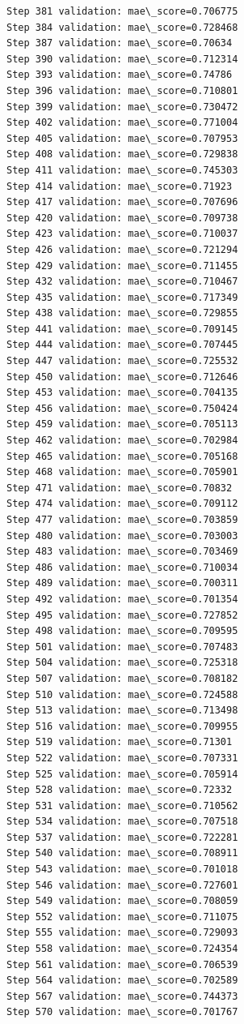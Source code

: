 \documentclass[11pt]{article}
\begin{document}
\begin{Verbatim}[commandchars=\\\{\}]
Step 381 validation: mae\_score=0.706775
Step 384 validation: mae\_score=0.728468
Step 387 validation: mae\_score=0.70634
Step 390 validation: mae\_score=0.712314
Step 393 validation: mae\_score=0.74786
Step 396 validation: mae\_score=0.710801
Step 399 validation: mae\_score=0.730472
Step 402 validation: mae\_score=0.771004
Step 405 validation: mae\_score=0.707953
Step 408 validation: mae\_score=0.729838
Step 411 validation: mae\_score=0.745303
Step 414 validation: mae\_score=0.71923
Step 417 validation: mae\_score=0.707696
Step 420 validation: mae\_score=0.709738
Step 423 validation: mae\_score=0.710037
Step 426 validation: mae\_score=0.721294
Step 429 validation: mae\_score=0.711455
Step 432 validation: mae\_score=0.710467
Step 435 validation: mae\_score=0.717349
Step 438 validation: mae\_score=0.729855
Step 441 validation: mae\_score=0.709145
Step 444 validation: mae\_score=0.707445
Step 447 validation: mae\_score=0.725532
Step 450 validation: mae\_score=0.712646
Step 453 validation: mae\_score=0.704135
Step 456 validation: mae\_score=0.750424
Step 459 validation: mae\_score=0.705113
Step 462 validation: mae\_score=0.702984
Step 465 validation: mae\_score=0.705168
Step 468 validation: mae\_score=0.705901
Step 471 validation: mae\_score=0.70832
Step 474 validation: mae\_score=0.709112
Step 477 validation: mae\_score=0.703859
Step 480 validation: mae\_score=0.703003
Step 483 validation: mae\_score=0.703469
Step 486 validation: mae\_score=0.710034
Step 489 validation: mae\_score=0.700311
Step 492 validation: mae\_score=0.701354
Step 495 validation: mae\_score=0.727852
Step 498 validation: mae\_score=0.709595
Step 501 validation: mae\_score=0.707483
Step 504 validation: mae\_score=0.725318
Step 507 validation: mae\_score=0.708182
Step 510 validation: mae\_score=0.724588
Step 513 validation: mae\_score=0.713498
Step 516 validation: mae\_score=0.709955
Step 519 validation: mae\_score=0.71301
Step 522 validation: mae\_score=0.707331
Step 525 validation: mae\_score=0.705914
Step 528 validation: mae\_score=0.72332
Step 531 validation: mae\_score=0.710562
Step 534 validation: mae\_score=0.707518
Step 537 validation: mae\_score=0.722281
Step 540 validation: mae\_score=0.708911
Step 543 validation: mae\_score=0.701018
Step 546 validation: mae\_score=0.727601
Step 549 validation: mae\_score=0.708059
Step 552 validation: mae\_score=0.711075
Step 555 validation: mae\_score=0.729093
Step 558 validation: mae\_score=0.724354
Step 561 validation: mae\_score=0.706539
Step 564 validation: mae\_score=0.702589
Step 567 validation: mae\_score=0.744373
Step 570 validation: mae\_score=0.701767

\end{Verbatim}
\end{document}
